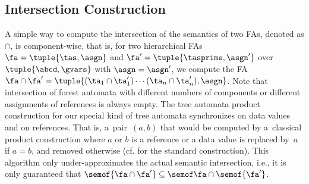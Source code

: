 \subsection{Intersection Construction}
A simple way to compute 
%
the intersection of the semantics of two FAs, denoted as $\cap$, is com\-po\-nent-wise, 
that is, for two hierarchical FAs $\fa = \tuple{\tas,\asgn}$ and $\fa' = \tuple{\tasprime,\asgn'}$ over $\tuple{\abcd, \gvars}$ with $\asgn=\asgn'$,
we compute the FA $\fa\cap\fa' =
\tuple{(\ta_1\cap\ta_1')\cdots(\ta_n\cap\ta_n'), \asgn}$.
Note that intersection of forest automata with different numbers of components or different assignments of references is always empty.
%
The tree automata product construction for our special kind of tree automata
synchronizes on data values and on references.
That is, a~pair~$(a,b)$ that would be computed by a~classical product
construction where $a$ or $b$ is a reference or a data value is replaced by~$a$
if $a = b$, and removed otherwise (cf. \cite{tata} for the standard construction).
%
This  algorithm only under-approximates the actual semantic intersection, i.e., it is only guaranteed that $\semof{\fa\cap\fa'}\subseteq\semof\fa\cap \semof{\fa'}$.

